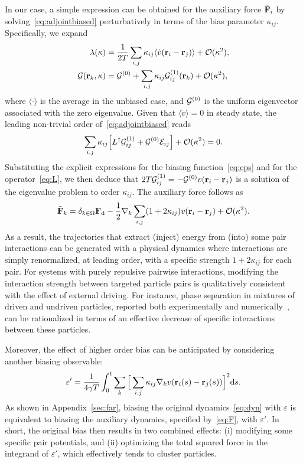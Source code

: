 \documentclass[pre, superscriptaddress, twocolumn,pre]{revtex4-1}
\begin{document}
In our case, a simple expression can be obtained for the auxiliary force $\tilde{\bf F}_i$  by solving~\eqref{eq:adjointbiased} perturbatively in terms of the bias parameter $\kappa_{ij}$. Specifically, we expand
\begin{equation}
	\begin{aligned}
		\lambda(\kappa) &= \frac{1}{2T} \sum_{i,j}\kappa_{ij}\langle\dot v({\bf r}_i- {\bf r}_j)\rangle + {\cal O}(\kappa^2) ,
		\\
		{\cal G}({\bf r}_k,\kappa) &= {\cal G}^{(0)} + \sum_{i,j}\kappa_{ij}{\cal G}_{ij}^{(1)}({\bf r}_k) + {\cal O}(\kappa^2) ,
	\end{aligned}
\end{equation}
where $\langle\cdot\rangle$ is the average in the unbiased case, and ${\cal G}^{(0)}$ is the uniform eigenvector associated with the zero eigenvalue. Given that $\langle\dot v\rangle=0$ in steady state, the leading non-trivial order of~\eqref{eq:adjointbiased} reads
\begin{equation}
	\sum_{i,j}\kappa_{ij}\Big[L^\dagger{\cal G}_{ij}^{(1)} + {\cal G}^{(0)} {\cal E}_{ij}\Big] + {\cal O}(\kappa^2) = 0 .
\end{equation}
Substituting the explicit expressions for the biasing function~\eqref{eq:eps} and for the operator~\eqref{eq:L}, we then deduce that $2T{\cal G}_{ij}^{(1)}=-{\cal G}^{(0)} v({\bf r}_i-{\bf r}_j)$ is a solution of the eigenvalue problem to order $\kappa_{ij}$. The auxiliary force follows as
\begin{equation}\label{eq:F}
	\tilde{\bf F}_k = \delta_{k\in\Omega}{\bf F}_{\rm d} - \frac{1}{2}\nabla_k\sum_{i,j}(1+2\kappa_{ij}) v({\bf r}_i-{\bf r}_j) + {\cal O}(\kappa^2) .
\end{equation}
As a result, the trajectories that extract (inject) energy from (into) some pair interactions can be generated with a physical dynamics where interactions are simply renormalized, at leading order, with a specific strength $1+2\kappa_{ij}$ for each pair. For systems with purely repulsive pairwise interactions, modifying the interaction strength between targeted particle pairs is qualitatively consistent with the effect of external driving. For instance, phase separation in mixtures of driven and undriven particles, reported both experimentally and numerically~\cite{delJunco2018,Han2016}, can be rationalized in terms of an effective decrease of specific interactions between these particles.


Moreover, the effect of higher order bias can be anticipated by considering another biasing observable:
\begin{equation}\label{eq:eps_prime}
	\varepsilon' = \frac{1}{4\gamma T}\int_0^t\sum_k\Big[\sum_{i,j}\kappa_{ij}\nabla_kv({\bf r}_i(s)-{\bf r}_j(s))\Big]^2{\rm d}s .
\end{equation}
As shown in Appendix~\ref{sec:far}, biasing the original dynamics~\eqref{eq:dyn} with $\varepsilon$ is equivalent to biasing the auxiliary dynamics, specified by~\eqref{eq:F}, with $\varepsilon'$. In short, the original bias then results in two combined effects: (i) modifying some specific pair potentials, and (ii) optimizing the total squared force in the integrand of $\varepsilon'$, which effectively tends to cluster particles.
\end{document}
